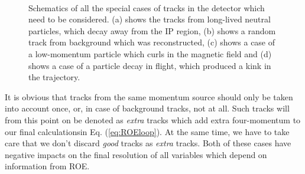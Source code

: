\documentclass[oneside,a4paper,openany,12pt]{scrbook}
\begin{document}
\begin{figure}[H]
\centering
{}%
\\
%
%
\caption{Schematics of all the special cases of tracks in the detector which need to be considered. (a) shows the tracks from long-lived neutral particles, which decay away from the IP region, (b) shows a random track from background which was reconstructed, (c) shows a case of a low-momentum particle which curls in the magnetic field and (d) shows a case of a particle decay in flight, which produced a kink in the trajectory.}
\label{fig:track_cleanup}
\end{figure}

It is obvious that tracks from the same momentum source should only be taken into account once, or, in case of background tracks, not at all. Such tracks will from this point on be denoted as \textit{extra} tracks which add extra four-momentum to our final calculationsin Eq. (\ref{eq:ROEloop}). At the same time, we have to take care that we don't discard \textit{good} tracks as \textit{extra} tracks. Both of these cases have negative impacts on the final resolution of all variables which depend on information from ROE.
\end{document}
